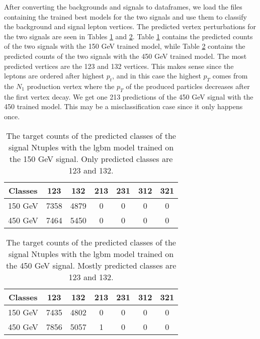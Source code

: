\documentclass[a4paper, american, 12pt]{report}
\begin{document}
	After converting the backgrounds and signals to dataframes, we load the files containing the trained best models for the two signals and use them to classify the background and signal lepton vertices. The predicted vertex perturbations for the two signals are seen in Tables \ref{tab:Counts_150signal_Ntuples} and \ref{tab:Counts_450signal_Ntuples}. Table \ref{tab:Counts_150signal_Ntuples} contains the predicted counts of the two signals with the 150 GeV trained model, while Table \ref{tab:Counts_450signal_Ntuples} contains the predicted counts of the two signals with the 450 GeV trained model. The most predicted vertices are the 123 and 132 vertices. This makes sense since the leptons are ordered after highest $p_t$, and in this case the highest $p_T$ comes from the $N_1$ production vertex where the $p_T$ of the produced particles decreases after the first vertex decay. We get one 213 predictions of the 450 GeV signal with the 450 trained model. This may be a misclassification case since it only happens once.
	\begin{table}[htbp!]
		\centering
		\begin{tabular}{ |c|c|c|c|c|c|c| }
			\hline \rule{0pt}{13pt}
			Classes & 123 & 132 & 213 & 231 & 312 & 321 \\
			\hline \rule{0pt}{13pt}
			150 GeV & 7358 & 4879 & 0 & 0 & 0 & 0 \\
			\hline \rule{0pt}{13pt}
			450 GeV & 7464 & 5450 & 0 & 0 & 0 & 0 \\
			\hline
		\end{tabular}	
		\caption[Target counts of predicted signal Ntuples with the 150 GeV trained model.]{The target counts of the predicted classes of the signal Ntuples with the \acrshort{lgbm} model trained on the 150 GeV signal. Only predicted classes are 123 and 132.}
		\label{tab:Counts_150signal_Ntuples}
	\end{table}
	\begin{table}[htbp!]
		\centering
		\begin{tabular}{ |c|c|c|c|c|c|c| }
			\hline \rule{0pt}{13pt}
			Classes & 123 & 132 & 213 & 231 & 312 & 321 \\
			\hline \rule{0pt}{13pt}
			150 GeV & 7435 & 4802 & 0 & 0 & 0 & 0 \\
			\hline \rule{0pt}{13pt}
			450 GeV & 7856 & 5057 & 1 & 0 & 0 & 0 \\
			\hline
		\end{tabular}	
		\caption[Target counts of predicted signal Ntuples with the 450 GeV trained model.]{The target counts of the predicted classes of the signal Ntuples with the \acrshort{lgbm} model trained on the 450 GeV signal. Mostly predicted classes are 123 and 132.}
		\label{tab:Counts_450signal_Ntuples}
	\end{table}
\end{document}
